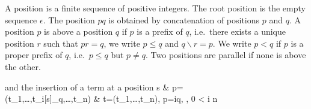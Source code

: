 
\begin{definition}\label{def:position}
	A {\myem position} is a finite sequence of positive integers.
	The root position is the empty sequence $\epsilon$.
	The position $pq$ is obtained by concatenation of positions $p$ and $q$.
	A position $p$ is above a position $q$ if $p$ is a prefix of $q$, 
	i.e.~there exists a unique position $r$ such that $pr = q$, 
	we write $p\leq q$ and $q\backslash r = p$.
	We write $p<q$ if $p$ is a proper prefix of $q$, i.e.~$p\leq q$ but $p\neq q$.
	Two positions are parallel if none is above the other.
	
\end{definition}
\begin{definition}
	
	
	and the insertion of a term at a position
	{
		s 		& p=\epsilon \\
		\mf(t_1,\ldots,t_i[s]_q,\ldots,t_n)	& t=\mf(t_1,\ldots,t_n), p=iq, \mf\in\mcFfn, 0 < i \leq n
	}
\end{definition}